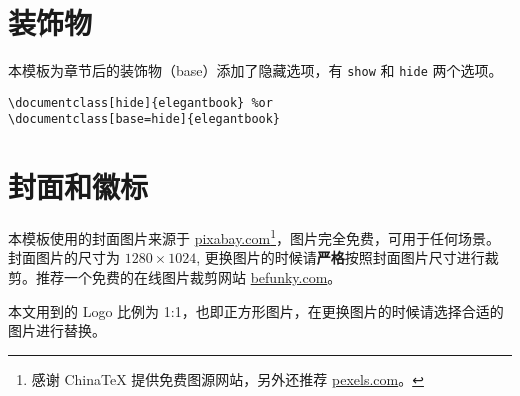 \documentclass[cn,11pt,fancy,hide]{elegantbook}
\begin{document}
\section{装饰物}

本模板为章节后的装饰物（base）添加了隐藏选项，有 \lstinline{show} 和 \lstinline{hide} 两个选项。
\begin{lstlisting}
\documentclass[hide]{elegantbook} %or
\documentclass[base=hide]{elegantbook}
\end{lstlisting}

\section{封面和徽标}

本模板使用的封面图片来源于 \href{https://pixabay.com/en/tea-time-poetry-coffee-reading-3240766/}{pixabay.com}\footnote{感谢 China\TeX{} 提供免费图源网站，另外还推荐 \href{https://www.pexels.com/}{pexels.com}。}，图片完全免费，可用于任何场景。封面图片的尺寸为 $1280 \times 1024$, 更换图片的时候请\textbf{严格}按照封面图片尺寸进行裁剪。推荐一个免费的在线图片裁剪网站 \href{https://www.befunky.com/create/crop-photo/}{befunky.com}。

本文用到的 Logo 比例为 1:1，也即正方形图片，在更换图片的时候请选择合适的图片进行替换。
\end{document}

